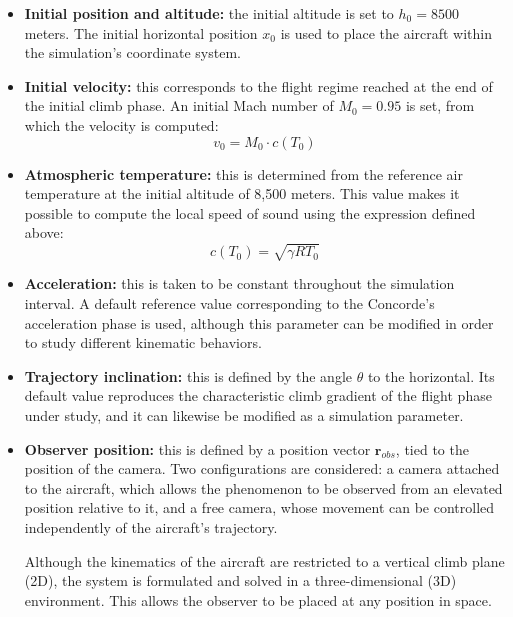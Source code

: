 \documentclass[10.5pt]{article}
\begin{document}
	\begin{itemize}
		
		\item \textbf{Initial position and altitude:} the initial altitude is set to $h_0=8500$ meters. The initial horizontal position $x_0$ is used to place the aircraft within the simulation's coordinate system.
		
		\item \textbf{Initial velocity:} this corresponds to the flight regime reached at the end of the initial climb phase. An initial Mach number of $M_0=0.95$ is set, from which the velocity is computed:
		\begin{equation*}
			v_0 = M_0 \cdot c(T_0)
		\end{equation*}
		
		\item \textbf{Atmospheric temperature:} this is determined from the reference air temperature at the initial altitude of 8,500 meters. This value makes it possible to compute the local speed of sound using the expression defined above:
		\begin{equation*}
			c(T_0) = \sqrt{\gamma R T_0}
		\end{equation*}
		
		\item \textbf{Acceleration:} this is taken to be constant throughout the simulation interval. A default reference value corresponding to the Concorde's acceleration phase is used, although this parameter can be modified in order to study different kinematic behaviors.
		
		\item \textbf{Trajectory inclination:} this is defined by the angle $\theta$ to the horizontal. Its default value reproduces the characteristic climb gradient of the flight phase under study, and it can likewise be modified as a simulation parameter.
		
		\item \textbf{Observer position:} this is defined by a position vector $\mathbf{r}_{obs}$, tied to the position of the camera. Two configurations are considered: a camera attached to the aircraft, which allows the phenomenon to be observed from an elevated position relative to it, and a free camera, whose movement can be controlled independently of the aircraft's trajectory.
		
		Although the kinematics of the aircraft are restricted to a vertical climb plane (2D), the system is formulated and solved in a three-dimensional (3D) environment. This allows the observer to be placed at any position in space.
		
	\end{itemize}
	
\end{document}
